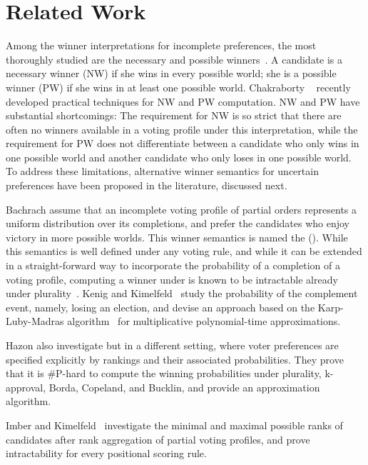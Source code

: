 \section{Related Work}
\label{sec:related}

 Among the winner interpretations for incomplete preferences, the most thoroughly studied are the necessary and possible winners~\cite{konczak2005voting}. A candidate is a necessary winner (NW) if she wins in every possible world;  she is a possible winner (PW) if she wins in at least one possible world.
Chakraborty \etal~\cite{DBLP:journals/tdasci/ChakrabortyDKKR21} recently developed practical techniques for NW and PW computation. NW and PW have substantial shortcomings: The requirement for NW is so strict that there are often no  winners available in a voting profile under this interpretation, while the requirement for PW does not differentiate between a candidate who only wins in one possible world and another candidate who only loses in one possible world. To address these limitations, alternative winner semantics for uncertain preferences have been proposed in the literature, discussed next.

Bachrach \etal \cite{DBLP:conf/aaai/BachrachBF10} assume that an incomplete voting profile of partial orders represents a uniform distribution over its completions, and prefer the candidates who enjoy victory in more possible worlds. This winner semantics is named the \e{\mPw} (\mpw).
While this semantics is well defined under any voting rule, and while it can be extended in a straight-forward way to incorporate the probability of a completion of a voting profile, computing a winner under \mpw is known to be intractable already under plurality~\cite{DBLP:conf/aaai/BachrachBF10}. Kenig and Kimelfeld~\cite{DBLP:conf/aaai/KenigK19} study the probability of the complement event, namely, losing an election, and devise an approach based on the Karp-Luby-Madras algorithm~\cite{DBLP:journals/jal/KarpLM89} for multiplicative polynomial-time approximations.

Hazon \etal \cite{DBLP:journals/ai/HazonAKW12} also investigate \mpw but in a different setting, where voter preferences are specified explicitly by rankings and their associated probabilities. They prove that it is \#P-hard to compute the winning probabilities under plurality, k-approval, Borda, Copeland, and Bucklin, and provide an approximation algorithm.

Imber and Kimelfeld~\cite{DBLP:conf/atal/ImberK21a} investigate the minimal and maximal possible ranks of candidates after rank aggregation of partial voting profiles, and prove intractability for every positional scoring rule.

